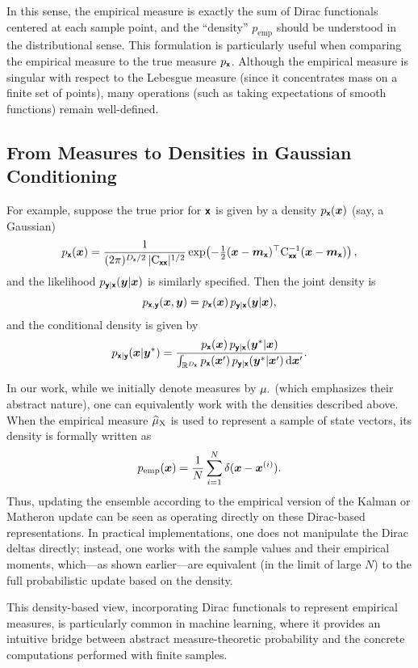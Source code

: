 \documentclass[wcp]{jmlr} %
\begin{document}
In this sense, the empirical measure is exactly the sum of Dirac functionals centered at each sample point, and the “density” \(p_{\text{emp}}\) should be understood in the distributional sense. This formulation is particularly useful when comparing the empirical measure to the true measure \(p_{\boldsymbol{\mathsf{x}}}\). Although the empirical measure is singular with respect to the Lebesgue measure (since it concentrates mass on a finite set of points), many operations (such as taking expectations of smooth functions) remain well-defined.

\subsection*{From Measures to Densities in Gaussian Conditioning}

For example, suppose the true prior for \(\boldsymbol{\mathsf{x}}\) is given by a density \(p_{\boldsymbol{\mathsf{x}}}(\boldsymbol{x})\) (say, a Gaussian)
\[
    p_{\boldsymbol{\mathsf{x}}}(\boldsymbol{x}) = \frac{1}{(2\pi)^{D_{\boldsymbol{\mathsf{x}}}/2} \,|\mathrm{C}_{\boldsymbol{\mathsf{xx}}}|^{1/2}} \exp\!\left(-\tfrac{1}{2}(\boldsymbol{x}-\boldsymbol{m}_{\boldsymbol{\mathsf{x}}})^\top \mathrm{C}_{\boldsymbol{\mathsf{xx}}}^{-1} (\boldsymbol{x}-\boldsymbol{m}_{\boldsymbol{\mathsf{x}}})\right),
\]
and the likelihood \(p_{\boldsymbol{\mathsf{y}}|\boldsymbol{\mathsf{x}}}(\boldsymbol{y}|\boldsymbol{x})\) is similarly specified. Then the joint density is
\begin{equation}
    p_{\boldsymbol{\mathsf{x}},\boldsymbol{\mathsf{y}}}(\boldsymbol{x},\boldsymbol{y})
    = p_{\boldsymbol{\mathsf{x}}}(\boldsymbol{x})\,p_{\boldsymbol{\mathsf{y}}|\boldsymbol{\mathsf{x}}}(\boldsymbol{y}|\boldsymbol{x}),
\end{equation}
and the conditional density is given by
\begin{equation}
    p_{\boldsymbol{\mathsf{x}}|\boldsymbol{\mathsf{y}}}(\boldsymbol{x}|\boldsymbol{y}^*)
    = \frac{p_{\boldsymbol{\mathsf{x}}}(\boldsymbol{x})\,p_{\boldsymbol{\mathsf{y}}|\boldsymbol{\mathsf{x}}}(\boldsymbol{y}^*|\boldsymbol{x})}{\int_{\mathbb{R}^{D_{\boldsymbol{\mathsf{x}}}}} p_{\boldsymbol{\mathsf{x}}}(\boldsymbol{x}')\,p_{\boldsymbol{\mathsf{y}}|\boldsymbol{\mathsf{x}}}(\boldsymbol{y}^*|\boldsymbol{x}')\,\mathrm{d}\boldsymbol{x}'}.
\end{equation}

In our work, while we initially denote measures by \(\Law[\cdot]\) (which emphasizes their abstract nature), one can equivalently work with the densities described above. When the empirical measure \(\ELaw[\mm{X}]\) is used to represent a sample of state vectors, its density is formally written as
\begin{equation}
    p_{\text{emp}}(\boldsymbol{x}) = \frac{1}{N} \sum_{i=1}^N \delta(\boldsymbol{x}-\boldsymbol{x}^{(i)}).
\end{equation}
Thus, updating the ensemble according to the empirical version of the Kalman or Matheron update can be seen as operating directly on these Dirac-based representations. In practical implementations, one does not manipulate the Dirac deltas directly; instead, one works with the sample values and their empirical moments, which—as shown earlier—are equivalent (in the limit of large \(N\)) to the full probabilistic update based on the density.

This density-based view, incorporating Dirac functionals to represent empirical measures, is particularly common in machine learning, where it provides an intuitive bridge between abstract measure-theoretic probability and the concrete computations performed with finite samples.
\end{document}
